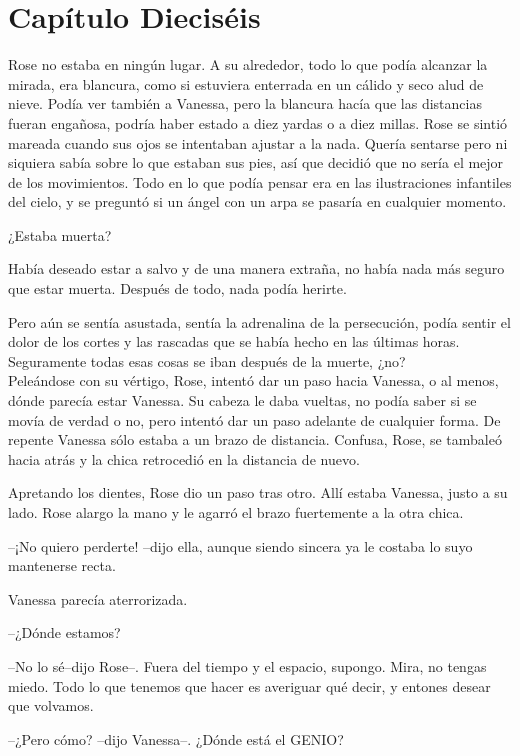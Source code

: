 
\chapter*{Capítulo Dieciséis}

Rose no estaba en ningún lugar. A su alrededor, todo lo que podía
alcanzar la mirada, era blancura, como si estuviera enterrada en un
cálido y seco alud de nieve. Podía ver también a Vanessa, pero la
blancura hacía que las distancias fueran engañosa, podría haber estado a
diez yardas o a diez millas. Rose se sintió mareada cuando sus ojos se
intentaban ajustar a la nada. Quería sentarse pero ni siquiera sabía
sobre lo que estaban sus pies, así que decidió que no sería el mejor de
los movimientos. Todo en lo que podía pensar era en las ilustraciones
infantiles del cielo, y se preguntó si un ángel con un arpa se pasaría
en cualquier momento.

¿Estaba muerta?

Había deseado estar a salvo y de una manera extraña, no había nada más
seguro que estar muerta. Después de todo, nada podía herirte.

Pero aún se sentía asustada, sentía la adrenalina de la persecución,
podía sentir el dolor de los cortes y las rascadas que se había hecho en
las últimas horas. Seguramente todas esas cosas se iban después de la
muerte, ¿no?\\Peleándose con su vértigo, Rose, intentó dar un paso hacia
Vanessa, o al menos, dónde parecía estar Vanessa. Su cabeza le daba
vueltas, no podía saber si se movía de verdad o no, pero intentó dar un
paso adelante de cualquier forma. De repente Vanessa sólo estaba a un
brazo de distancia. Confusa, Rose, se tambaleó hacia atrás y la chica
retrocedió en la distancia de nuevo.

Apretando los dientes, Rose dio un paso tras otro. Allí estaba Vanessa,
justo a su lado. Rose alargo la mano y le agarró el brazo fuertemente a
la otra chica.

--¡No quiero perderte! --dijo ella, aunque siendo sincera ya le costaba
lo suyo mantenerse recta.

Vanessa parecía aterrorizada.

--¿Dónde estamos?

--No lo sé--dijo Rose--. Fuera del tiempo y el espacio, supongo. Mira,
no tengas miedo. Todo lo que tenemos que hacer es averiguar qué decir, y
entones desear que volvamos.

--¿Pero cómo? --dijo Vanessa--. ¿Dónde está el GENIO?


